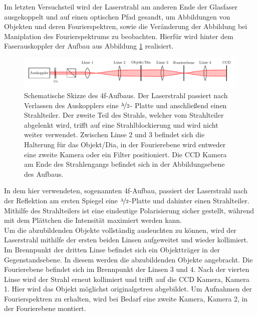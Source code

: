 

Im letzten Versuchsteil wird der Laserstrahl am anderen Ende der Glasfaser ausgekoppelt und auf einen optischen Pfad gesandt, um Abbildungen von Objekten und deren Fourierspektren, sowie die Veränderung der Abbildung bei Maniplation des Fourierspektrums zu beobachten. Hierfür wird hinter dem Faserauskoppler der Aufbau aus Abbildung \ref{fig:4f-aufbau} realisiert. \\

\begin{figure}[h]
	\centering
	\includegraphics[width=1\linewidth]{graphs/versuchsaufbau/4f-aufbau}
	\caption[Schematische Skizze des 4f-Aufbaus]{
		Schematische Skizze des 4f-Aufbaus. Der Laserstrahl passiert nach Verlassen des Auskopplers eine $\nicefrac{\lambda}{2}$- Platte und anschließend einen Strahlteiler. Der zweite Teil des Strahls, welcher vom Strahlteiler abgelenkt wird, trifft auf eine Strahlblockierung und wird nicht weiter verwendet. Zwischen Linse 2 und 3 befindet sich die Halterung für das Objekt/Dia, in der Fourierebene wird entweder eine zweite Kamera oder ein Filter positioniert. Die CCD Kamera am Ende des Strahlengangs befindet sich in der Abbildungsebene des Aufbaus.
	}
	\label{fig:4f-aufbau}
\end{figure}

In dem hier verwendeten, sogenannten 4f-Aufbau, passiert der Laserstrahl nach der Reflektion am ersten Spiegel eine $\nicefrac{\lambda}{2}$-Platte und dahinter einen Strahlteiler. Mithilfe des Strahlteilers ist eine eindeutige Polarisierung sicher gestellt, während mit dem Plättchen die Intensität maximiert werden kann.\\

Um die abzubildenden Objekte vollständig ausleuchten zu können, wird der Laserstrahl mithilfe der ersten beiden Linsen aufgeweitet und wieder kollimiert. Im Brennpunkt der dritten Linse befindet sich ein Objektträger in der Gegenstandsebene. In diesem werden die abzubildenden Objekte angebracht. Die Fourierebene befindet sich im Brennpunkt der Linsen 3 und 4. Nach der vierten Linse wird der Strahl erneut kollimiert und trifft auf die CCD Kamera, Kamera 1. Hier wird das Objekt möglichst originalgetreu abgebildet. Um Aufnahmen der Fourierspektren zu erhalten, wird bei Bedarf eine zweite Kamera, Kamera 2, in der Fourierebene montiert. \\ 

